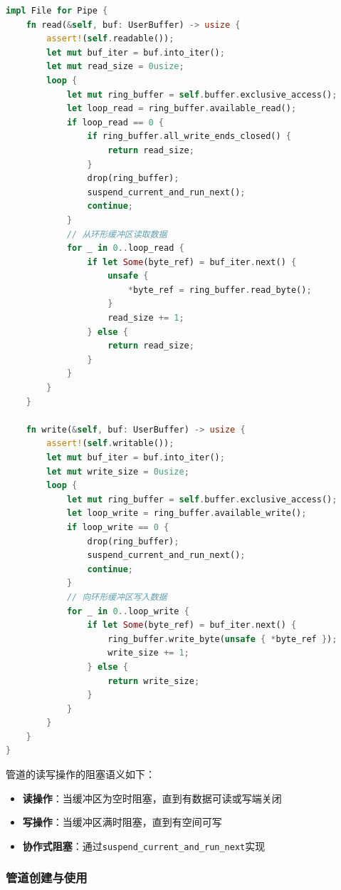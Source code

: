 \begin{lstlisting}[language=Rust,caption={管道读写操作}, label={lst:pipe-operations}]
impl File for Pipe {
    fn read(&self, buf: UserBuffer) -> usize {
        assert!(self.readable());
        let mut buf_iter = buf.into_iter();
        let mut read_size = 0usize;
        loop {
            let mut ring_buffer = self.buffer.exclusive_access();
            let loop_read = ring_buffer.available_read();
            if loop_read == 0 {
                if ring_buffer.all_write_ends_closed() {
                    return read_size;
                }
                drop(ring_buffer);
                suspend_current_and_run_next();
                continue;
            }
            // 从环形缓冲区读取数据
            for _ in 0..loop_read {
                if let Some(byte_ref) = buf_iter.next() {
                    unsafe {
                        *byte_ref = ring_buffer.read_byte();
                    }
                    read_size += 1;
                } else {
                    return read_size;
                }
            }
        }
    }

    fn write(&self, buf: UserBuffer) -> usize {
        assert!(self.writable());
        let mut buf_iter = buf.into_iter();
        let mut write_size = 0usize;
        loop {
            let mut ring_buffer = self.buffer.exclusive_access();
            let loop_write = ring_buffer.available_write();
            if loop_write == 0 {
                drop(ring_buffer);
                suspend_current_and_run_next();
                continue;
            }
            // 向环形缓冲区写入数据
            for _ in 0..loop_write {
                if let Some(byte_ref) = buf_iter.next() {
                    ring_buffer.write_byte(unsafe { *byte_ref });
                    write_size += 1;
                } else {
                    return write_size;
                }
            }
        }
    }
}
\end{lstlisting}

管道的读写操作的阻塞语义如下：
\begin{itemize}
    \item \textbf{读操作}：当缓冲区为空时阻塞，直到有数据可读或写端关闭
    \item \textbf{写操作}：当缓冲区满时阻塞，直到有空间可写
    \item \textbf{协作式阻塞}：通过\lstinline[language=Rust]{suspend_current_and_run_next}实现
\end{itemize}

\subsubsection{管道创建与使用}

